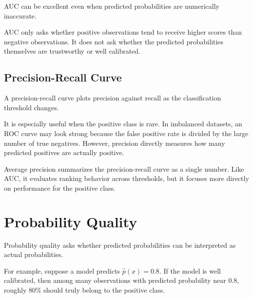 \documentclass[
  letterpaper,
  DIV=11,
  numbers=noendperiod]{scrreprt}
\theoremstyle{definition}
\theoremstyle{definition}
\theoremstyle{plain}
\theoremstyle{plain}
\theoremstyle{remark}
\begin{document}
\begin{tcolorbox}[enhanced jigsaw, arc=.35mm, bottomrule=.15mm, bottomtitle=1mm, breakable, colback=white, colbacktitle=quarto-callout-caution-color!10!white, colframe=quarto-callout-caution-color-frame, coltitle=black, left=2mm, leftrule=.75mm, opacityback=0, opacitybacktitle=0.6, rightrule=.15mm, title=\textcolor{quarto-callout-caution-color}{\faFire}\hspace{0.5em}{AUC is not calibration}, titlerule=0mm, toprule=.15mm, toptitle=1mm]

AUC can be excellent even when predicted probabilities are numerically
inaccurate.

AUC only asks whether positive observations tend to receive higher
scores than negative observations. It does not ask whether the predicted
probabilities themselves are trustworthy or well calibrated.

\end{tcolorbox}

\subsection{Precision-Recall Curve}\label{precision-recall-curve}

A precision-recall curve plots precision against recall as the
classification threshold changes.

It is especially useful when the positive class is rare. In imbalanced
datasets, an ROC curve may look strong because the false positive rate
is divided by the large number of true negatives. However, precision
directly measures how many predicted positives are actually positive.

Average precision summarizes the precision-recall curve as a single
number. Like AUC, it evaluates ranking behavior across thresholds, but
it focuses more directly on performance for the positive class.

\section{Probability Quality}\label{probability-quality}

Probability quality asks whether predicted probabilities can be
interpreted as actual probabilities.

For example, suppose a model predicts \(\hat p(x)=0.8\). If the model is
well calibrated, then among many observations with predicted probability
near \(0.8\), roughly \(80\%\) should truly belong to the positive
class.
\end{document}
